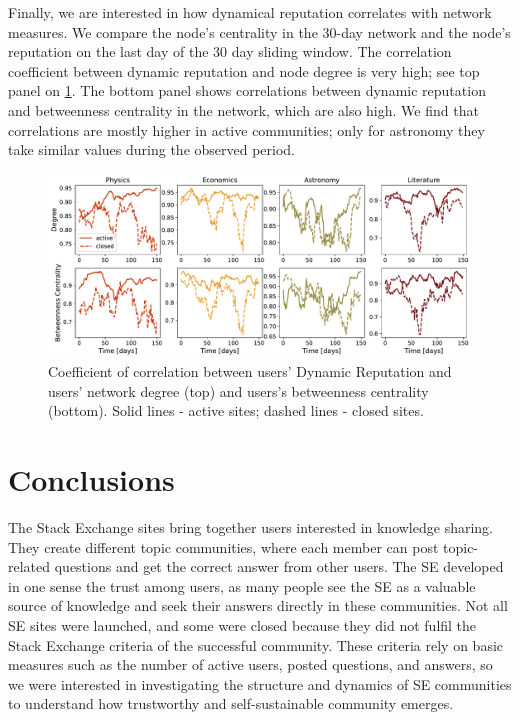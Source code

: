 Finally, we are interested in how dynamical reputation correlates with network measures. We compare the node's centrality in the 30-day network and the node's reputation on the last day of the 30 day sliding window. The correlation coefficient between dynamic reputation and node degree is very high; see top panel on \ref{fig:dyn_rep_centrality}. The bottom panel shows correlations between dynamic reputation and betweenness centrality in the network, which are also high. We find that correlations are mostly higher in active communities; only for astronomy they take similar values during the observed period. 

\begin{figure}[H]
	\centering
	\includegraphics[width=\linewidth]{figures/stackexchange/correlations.pdf}
	\caption{Coefficient of correlation between users' Dynamic Reputation and users' network degree (top) and users's betweenness centrality (bottom). Solid lines - active sites; dashed lines - closed sites.}
	\label{fig:dyn_rep_centrality}
\end{figure}

\section{Conclusions}

The Stack Exchange sites bring together users interested in knowledge sharing. They create different topic communities, where each member can post topic-related questions and get the correct answer from other users. The SE developed in one sense the trust among users, as many people see the SE as a valuable source of knowledge and seek their answers directly in these communities. Not all SE sites were launched, and some were closed because they did not fulfil the Stack Exchange criteria of the successful community. These criteria rely on basic measures such as the number of active users, posted questions, and answers, so we were interested in investigating the structure and dynamics of SE communities to understand how trustworthy and self-sustainable community emerges. 

